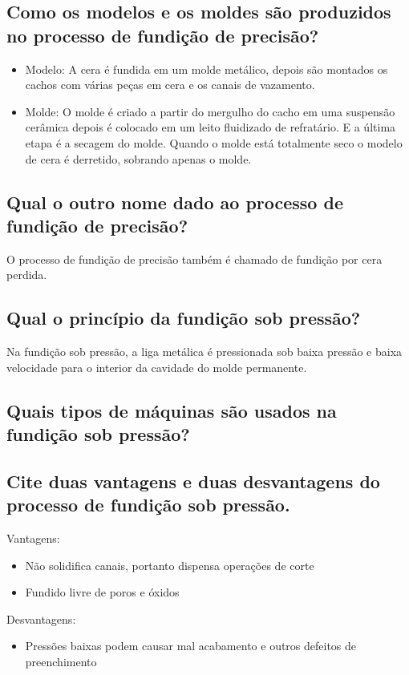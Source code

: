 \documentclass[a4paper, 12pt]{article}
\begin{document}
	\subsection{Como os modelos e os moldes são produzidos no processo de fundição
de precisão?}
	\begin{itemize}
	\item Modelo: A cera é fundida em um molde metálico, depois são montados os cachos com várias peças em cera e os canais de vazamento.
	\item Molde: O molde é criado a partir do mergulho do cacho em uma suspensão cerâmica depois é colocado em um leito fluidizado de refratário. E a última etapa é a secagem do molde. Quando o molde está totalmente seco o modelo de cera é derretido, sobrando apenas o molde.
	\end{itemize}
	
	\subsection{Qual o outro nome dado ao processo de fundição de precisão?}
	O processo de fundição de precisão também é chamado de fundição por cera perdida.
	
	\subsection{Qual o princípio da fundição sob pressão?}
	Na fundição sob pressão, a liga metálica é pressionada sob baixa pressão e baixa velocidade para o interior da cavidade do molde permanente.
		
	\subsection{Quais tipos de máquinas são usados na fundição sob pressão?}
	
	\subsection{Cite duas vantagens e duas desvantagens do processo de fundição sob pressão.}
	Vantagens:	
	\begin{itemize}
		\item Não solidifica canais, portanto dispensa operações de corte
		\item Fundido livre de poros e óxidos
	\end{itemize}
	Desvantagens:
	\begin{itemize}
		\item Pressões baixas podem causar mal acabamento e outros defeitos de preenchimento
	\end{itemize}
	
\end{document}
